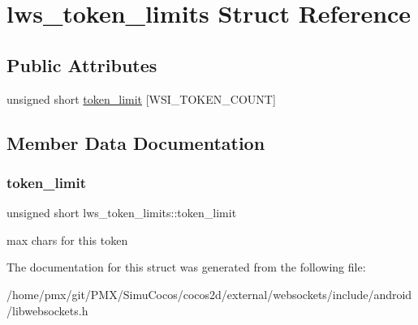 \hypertarget{structlws__token__limits}{}\section{lws\+\_\+token\+\_\+limits Struct Reference}
\label{structlws__token__limits}
\subsection*{Public Attributes}
\begin{DoxyCompactItemize}
\item 
unsigned short \hyperlink{structlws__token__limits_a05e837a6630254df1ed2df45d2b250d8}{token\+\_\+limit} \mbox{[}W\+S\+I\+\_\+\+T\+O\+K\+E\+N\+\_\+\+C\+O\+U\+NT\mbox{]}
\end{DoxyCompactItemize}


\subsection{Member Data Documentation}
\mbox{\label{structlws__token__limits_a05e837a6630254df1ed2df45d2b250d8}} 
\subsubsection{\texorpdfstring{token\+\_\+limit}{token\_limit}}
{\footnotesize\ttfamily unsigned short lws\+\_\+token\+\_\+limits\+::token\+\_\+limit}

max chars for this token 

The documentation for this struct was generated from the following file\+:\begin{DoxyCompactItemize}
\item 
/home/pmx/git/\+P\+M\+X/\+Simu\+Cocos/cocos2d/external/websockets/include/android/libwebsockets.\+h\end{DoxyCompactItemize}
